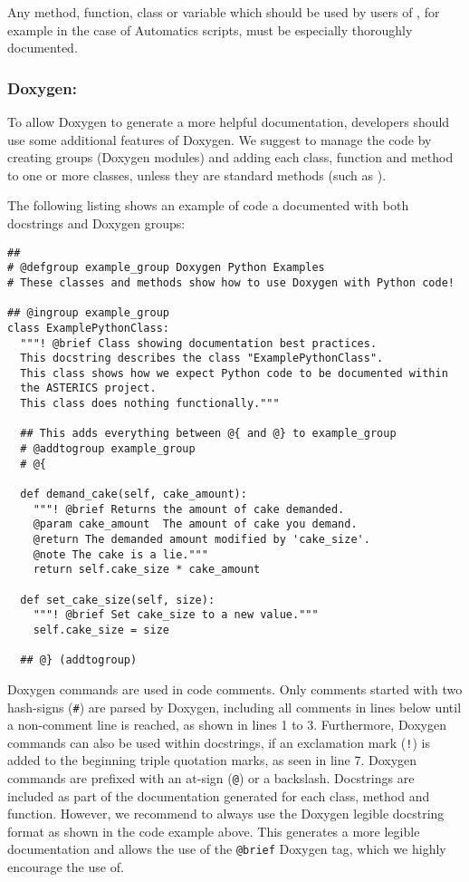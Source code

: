 Any method, function, class or variable which should be used by users of \asterics, for example in the case of Automatics scripts, must be especially thoroughly documented.


\subsubsection*{Doxygen:}

To allow Doxygen to generate a more helpful documentation, developers should use some additional features of Doxygen.
We suggest to manage the code by creating groups (Doxygen modules) and adding each class, function and method to one or more classes, unless they are standard methods (such as ).

The following listing shows an example of code a documented with both docstrings and Doxygen groups:

\begin{lstlisting}[style=AutomaticsPython]
##
# @defgroup example_group Doxygen Python Examples
# These classes and methods show how to use Doxygen with Python code!

## @ingroup example_group
class ExamplePythonClass:
  """! @brief Class showing documentation best practices.
  This docstring describes the class "ExamplePythonClass".
  This class shows how we expect Python code to be documented within
  the ASTERICS project.
  This class does nothing functionally."""

  ## This adds everything between @{ and @} to example_group
  # @addtogroup example_group
  # @{
  
  def demand_cake(self, cake_amount):
    """! @brief Returns the amount of cake demanded.
    @param cake_amount  The amount of cake you demand.
    @return The demanded amount modified by 'cake_size'.
    @note The cake is a lie."""
  	return self.cake_size * cake_amount

  def set_cake_size(self, size):
    """! @brief Set cake_size to a new value."""
    self.cake_size = size
    
  ## @} (addtogroup)
\end{lstlisting}

Doxygen commands are used in code comments.
Only comments started with two hash-signs (\texttt{\#}) are parsed by Doxygen, including all comments in lines below until a non-comment line is reached, as shown in lines 1 to 3.
Furthermore, Doxygen commands can also be used within docstrings, if an exclamation mark (\texttt{!}) is added to the beginning triple quotation marks, as seen in line 7.
Doxygen commands are prefixed with an at-sign (\texttt{@}) or a backslash.
Docstrings are included as part of the documentation generated for each class, method and function.
However, we recommend to always use the Doxygen legible docstring format as shown in the code example above.
This generates a more legible documentation and allows the use of the \texttt{@brief} Doxygen tag, which we highly encourage the use of.

